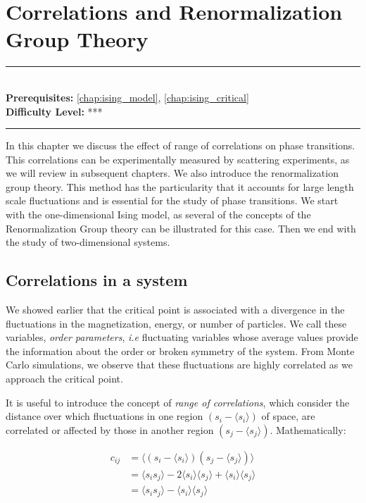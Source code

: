 \documentclass[book.tex]{subfiles}
\begin{document}
\chapter{Correlations and Renormalization Group Theory}

\label{chap:renorm_group}
\noindent\rule{11cm}{0.4pt} \\
\textbf{Prerequisites:} \autoref{chap:ising_model}, \autoref{chap:ising_critical}  \\
\textbf{Difficulty Level:} *** \\
\noindent\rule{11cm}{0.4pt}
\vspace{5mm}


In this chapter we discuss the effect of range of correlations on phase transitions. This correlations can be experimentally measured by scattering experiments, as we will review in subsequent chapters. We also introduce the renormalization group theory. This method has the particularity that it accounts for large length scale fluctuations and is essential for the study of phase transitions. We start with the one-dimensional Ising model, as several of the concepts of the Renormalization Group theory can be illustrated for this case. Then we end with the study of two-dimensional systems.

\section{Correlations in a system}

We showed earlier that the critical point is associated with a divergence in the fluctuations in the magnetization, energy, or number of particles. We call these variables, \textit{order parameters}, \textit{i.e} fluctuating variables whose average values provide the information about the order or broken symmetry of the system. From Monte Carlo simulations, we observe that these fluctuations are highly correlated as we approach the critical point.

It is useful to introduce the concept of \textit{range of correlations}, which consider the distance over which fluctuations in one region  $(s_i - \langle s_i \rangle)$ of space, are correlated or affected by those in another region $(s_j - \langle s_j \rangle)$. Mathematically:

\begin{align}\label{Eq1}
c_{ij} &= \langle (s_i - \langle s_i \rangle)(s_j - \langle s_j \rangle)\rangle \\
&=\langle s_i s_j \rangle -2 \langle s_i \rangle \langle s_j \rangle + \langle s_i \rangle \langle s_j \rangle \\
&= \langle s_i s_j \rangle - \langle s_i\rangle\langle s_j\rangle 
\end{align}
\end{document}
